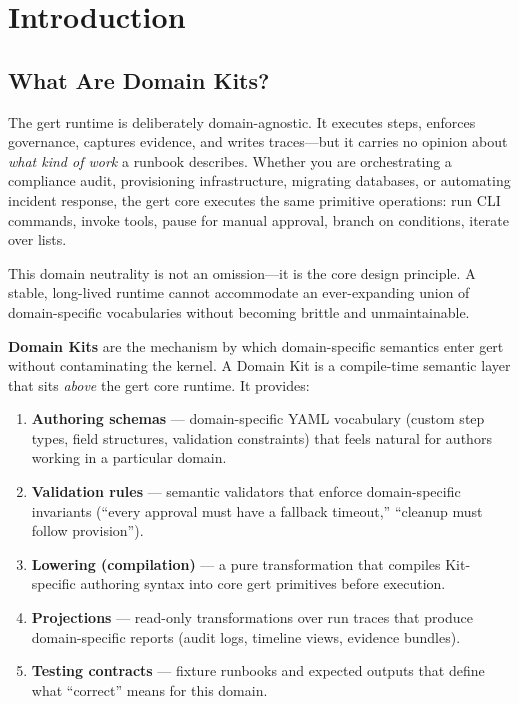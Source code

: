 
\chapter{Introduction}
\label{ch:introduction}

\section{What Are Domain Kits?}
\label{sec:what-are-kits}

The gert runtime is deliberately domain-agnostic. It executes steps, enforces
governance, captures evidence, and writes traces---but it carries no opinion
about \emph{what kind of work} a runbook describes. Whether you are orchestrating
a compliance audit, provisioning infrastructure, migrating databases, or
automating incident response, the gert core executes the same primitive
operations: run CLI commands, invoke tools, pause for manual approval, branch on
conditions, iterate over lists.

This domain neutrality is not an omission---it is the core design principle.
A stable, long-lived runtime cannot accommodate an ever-expanding union of
domain-specific vocabularies without becoming brittle and unmaintainable.

\textbf{Domain Kits} are the mechanism by which domain-specific semantics enter
gert without contaminating the kernel. A Domain Kit is a compile-time semantic
layer that sits \emph{above} the gert core runtime. It provides:

\begin{enumerate}
  \item \textbf{Authoring schemas} --- domain-specific YAML vocabulary (custom
    step types, field structures, validation constraints) that feels natural for
    authors working in a particular domain.
  \item \textbf{Validation rules} --- semantic validators that enforce
    domain-specific invariants (``every approval must have a fallback
    timeout,'' ``cleanup must follow provision'').
  \item \textbf{Lowering (compilation)} --- a pure transformation that compiles
    Kit-specific authoring syntax into core gert primitives before execution.
  \item \textbf{Projections} --- read-only transformations over run traces that
    produce domain-specific reports (audit logs, timeline views, evidence
    bundles).
  \item \textbf{Testing contracts} --- fixture runbooks and expected outputs
    that define what ``correct'' means for this domain.
\end{enumerate}


